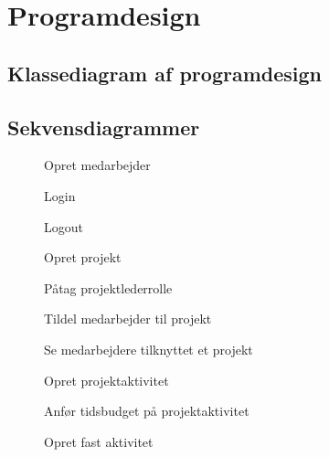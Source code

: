 \section{Programdesign}
\subsection{Klassediagram af programdesign}
\subsection{Sekvensdiagrammer}\label{sec:sequence}
\begin{figure}[H]
    \centering
    \caption{Opret medarbejder}\label{fig:sequenceRegisterEmployee}
\end{figure}
\begin{figure}[H]
    \centering
    \caption{Login}\label{fig:sequenceLogin}
\end{figure}
\begin{figure}[H]
    \centering
    \caption{Logout}\label{fig:sequenceLogout}
\end{figure}
\begin{figure}[H]
    \centering
    \caption{Opret projekt}\label{fig:sequenceCreateProject}
\end{figure}
\begin{figure}[H]
    \centering
    \caption{Påtag projektlederrolle}\label{fig:sequenceTakePLRole}
\end{figure}
\begin{figure}[H]
    \centering
    \caption{Tildel medarbejder til projekt}\label{fig:sequenceAssignEmployee}
\end{figure}
\begin{figure}[H]
    \centering
    \caption{Se medarbejdere tilknyttet et projekt}\label{fig:ViewAssignedEmployee}
\end{figure}
\begin{figure}[H]
    \centering
    \caption{Opret projektaktivitet}\label{fig:sequenceCreateProjectActivity}
\end{figure}
\begin{figure}[H]
    \centering
    \caption{Anfør tidsbudget på projektaktivitet}\label{fig:sequenceSetTimeBudget}
\end{figure}
\begin{figure}[H]
    \centering
    \caption{Opret fast aktivitet}\label{fig:sequenceCreateRegularActivity}
\end{figure}
